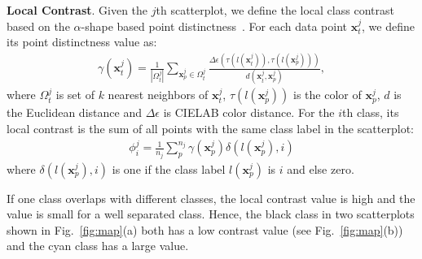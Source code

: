 \vspace{2mm}
\noindent\textbf{Local Contrast}.
Given the $j$th scatterplot, we define the local class contrast based on the $\alpha$-shape based point distinctness~\cite{Lu21}.  For each data point $\mathbf{x}^j_t$, we define its point distinctness value as:
\begin{align}
 \gamma (\mathbf{x}^j_t)=\frac{1}{|\Omega^j_t|} \sum_{\mathbf{x}^j_p \in \Omega^j_t}  \frac{\Delta\epsilon(\tau(l(\mathbf{x}^j_t)),\tau(l(\mathbf{x}^j_p)))}{d(\mathbf{x}^j_t,\mathbf{x}^j_p)} \nonumber ,
\end{align}
where $\Omega^j_t$ is set of $k$ nearest neighbors of $\mathbf{x}^j_t$, $\tau(l(\mathbf{x}^j_p))$ is the color of $\mathbf{x}^j_p$,  $d$ is the Euclidean distance and $\Delta\epsilon$ is CIELAB color distance.
For the $i$th class, its local contrast is the sum of all points with the same class label in the scatterplot:
\begin{align}\label{eq:nc}
 \phi^j_i = \frac{1}{n_j}\sum^{n_j}_{p}\gamma(\mathbf{x}^j_p) \delta(l(\mathbf{x}^j_p),i)
\end{align}
where $\delta(l(\mathbf{x}^j_p),i)$ is one if the class label $l(\mathbf{x}^j_p)$ is $i$ and else zero.

If one class overlaps with different classes, the local contrast value is high and the value is small for a well separated class. Hence, the black class in two scatterplots shown in Fig.~\ref{fig:map}(a) both has a low contrast value (see Fig.~\ref{fig:map}(b)) and the cyan class has a large value.


